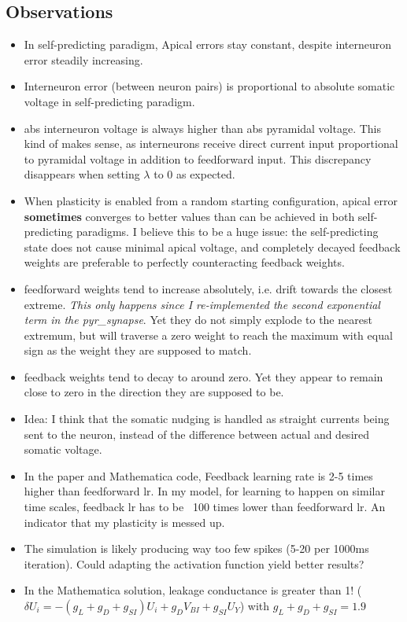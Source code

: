\documentclass[12pt,a4paper,titlepage]{report}
\begin{document}
\subsection*{Observations}

\begin{itemize}
\item In self-predicting paradigm, Apical errors stay constant, despite interneuron error steadily increasing.
\item Interneuron error (between neuron pairs) is proportional to absolute somatic voltage in self-predicting paradigm.
\item abs interneuron voltage is always higher than abs pyramidal voltage. This kind of makes sense, as interneurons receive direct current input proportional to pyramidal voltage in addition to feedforward input. This discrepancy disappears when setting $\lambda$ to 0 as expected.
\item When plasticity is enabled from a random starting configuration, apical error \textbf{sometimes} converges to better values than can be achieved in both self-predicting paradigms. I believe this to be a huge issue: the self-predicting state does not cause minimal apical voltage, and completely decayed feedback weights are preferable to perfectly counteracting feedback weights.
\item feedforward weights tend to increase absolutely, i.e. drift towards the closest extreme. \textit{This only happens since I re-implemented the second exponential term in the pyr\_synapse}. Yet they do not simply explode to the nearest extremum, but will traverse a zero weight to reach the maximum with equal sign as the weight they are supposed to match.
\item feedback weights tend to decay to around zero. Yet they appear to remain close to zero in the direction they are supposed to be.
\item Idea: I think that the somatic nudging is handled as straight currents being sent to the neuron, instead of the difference between actual and desired somatic voltage.
\item In the paper and Mathematica code, Feedback learning rate is 2-5 times higher than feedforward lr. In my model, for learning to happen on similar time scales, feedback lr has to be ~100 times lower than feedforward lr. An indicator that my plasticity is messed up.
\item The simulation is likely producing way too few spikes (5-20 per 1000ms iteration). Could adapting the activation function yield better results?
\item In the Mathematica solution, leakage conductance is greater than 1! ($\delta U_i = -(g_L + g_D + g_{SI}) U_i + g_D V_{BI} + g_{SI} U_Y$) with $g_L + g_D + g_{SI} = 1.9$
\end{itemize}
\end{document}
